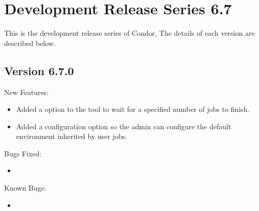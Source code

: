 \section{\label{sec:History-6-7}Development Release Series 6.7}

This is the development release series of Condor,
The details of each version are described below.

\subsection{\label{sec:New-6-7-0}Version 6.7.0}

\noindent New Features:

\begin{itemize}

  \item Added a  option to the  tool to wait for
      a specified number of jobs to finish.

  \item Added a configuration option 
      so the admin can configure the default environment inherited by
      user jobs.

\end{itemize}

\noindent Bugs Fixed:

\begin{itemize}
  \item
\end{itemize}

\noindent Known Bugs:

\begin{itemize}
  \item
\end{itemize}
